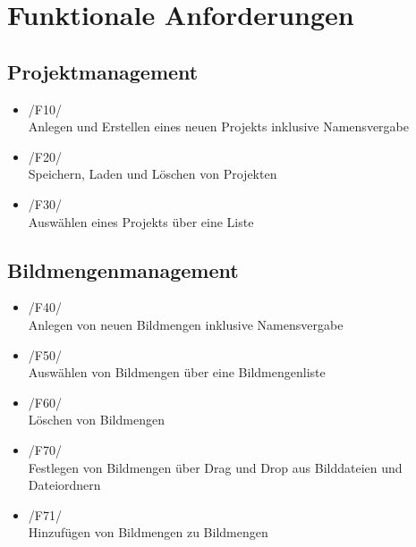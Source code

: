\section{Funktionale Anforderungen}

\subsection{Projektmanagement}
	\begin{itemize}
		\item /F10/\\ Anlegen und Erstellen eines neuen Projekts inklusive Namensvergabe
		\item /F20/\\ Speichern, Laden und Löschen von Projekten
		\item /F30/\\ Auswählen eines Projekts über eine Liste
	\end{itemize}

\subsection{Bildmengenmanagement}
	\begin{itemize}
		\item /F40/\\ Anlegen von neuen Bildmengen inklusive Namensvergabe
		\item /F50/\\ Auswählen von Bildmengen über eine Bildmengenliste
		\item /F60/\\ Löschen von Bildmengen
		\item /F70/\\ Festlegen von Bildmengen über Drag und Drop aus Bilddateien und Dateiordnern
		\item /F71/\\ Hinzufügen von Bildmengen zu Bildmengen
	\end{itemize}

